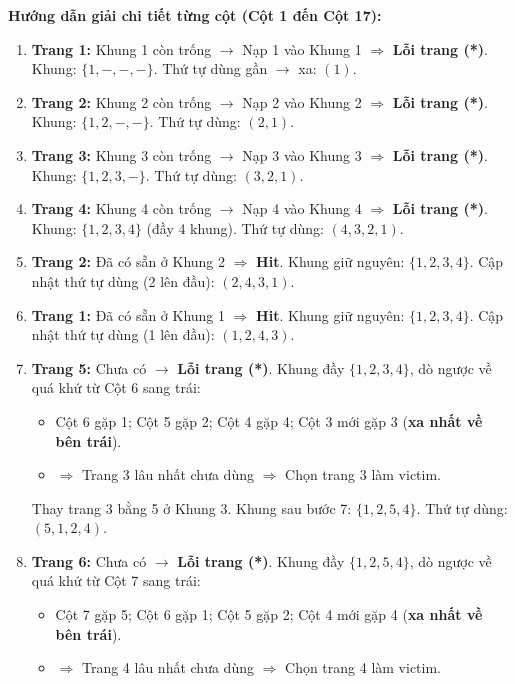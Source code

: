 \documentclass[11pt,a4paper]{article}
\begin{document}
\textbf{Hướng dẫn giải chi tiết từng cột (Cột 1 đến Cột 17):}
\begin{enumerate}[label=\textbf{Cột \arabic*:}, leftmargin=*, itemsep=2pt]
    \item \textbf{Trang 1:} Khung 1 còn trống $\rightarrow$ Nạp 1 vào Khung 1 $\Rightarrow$ \textbf{Lỗi trang (*)}. Khung: $\{1, -, -, -\}$. Thứ tự dùng gần $\rightarrow$ xa: $(1)$.
    \item \textbf{Trang 2:} Khung 2 còn trống $\rightarrow$ Nạp 2 vào Khung 2 $\Rightarrow$ \textbf{Lỗi trang (*)}. Khung: $\{1, 2, -, -\}$. Thứ tự dùng: $(2, 1)$.
    \item \textbf{Trang 3:} Khung 3 còn trống $\rightarrow$ Nạp 3 vào Khung 3 $\Rightarrow$ \textbf{Lỗi trang (*)}. Khung: $\{1, 2, 3, -\}$. Thứ tự dùng: $(3, 2, 1)$.
    \item \textbf{Trang 4:} Khung 4 còn trống $\rightarrow$ Nạp 4 vào Khung 4 $\Rightarrow$ \textbf{Lỗi trang (*)}. Khung: $\{1, 2, 3, 4\}$ (đầy 4 khung). Thứ tự dùng: $(4, 3, 2, 1)$.
    \item \textbf{Trang 2:} Đã có sẵn ở Khung 2 $\Rightarrow$ \textbf{Hit}. Khung giữ nguyên: $\{1, 2, 3, 4\}$. Cập nhật thứ tự dùng (2 lên đầu): $(2, 4, 3, 1)$.
    \item \textbf{Trang 1:} Đã có sẵn ở Khung 1 $\Rightarrow$ \textbf{Hit}. Khung giữ nguyên: $\{1, 2, 3, 4\}$. Cập nhật thứ tự dùng (1 lên đầu): $(1, 2, 4, 3)$.
    \item \textbf{Trang 5:} Chưa có $\rightarrow$ \textbf{Lỗi trang (*)}. Khung đầy $\{1, 2, 3, 4\}$, dò ngược về quá khứ từ Cột 6 sang trái:
    \begin{itemize}[noitemsep]
        \item Cột 6 gặp 1; Cột 5 gặp 2; Cột 4 gặp 4; Cột 3 mới gặp 3 (\textbf{xa nhất về bên trái}).
        \item $\Rightarrow$ Trang 3 lâu nhất chưa dùng $\Rightarrow$ Chọn trang 3 làm victim.
    \end{itemize}
    Thay trang 3 bằng 5 ở Khung 3. Khung sau bước 7: $\{1, 2, 5, 4\}$. Thứ tự dùng: $(5, 1, 2, 4)$.
    \item \textbf{Trang 6:} Chưa có $\rightarrow$ \textbf{Lỗi trang (*)}. Khung đầy $\{1, 2, 5, 4\}$, dò ngược về quá khứ từ Cột 7 sang trái:
    \begin{itemize}[noitemsep]
        \item Cột 7 gặp 5; Cột 6 gặp 1; Cột 5 gặp 2; Cột 4 mới gặp 4 (\textbf{xa nhất về bên trái}).
        \item $\Rightarrow$ Trang 4 lâu nhất chưa dùng $\Rightarrow$ Chọn trang 4 làm victim.

\end{itemize}
\end{enumerate}
\end{document}
